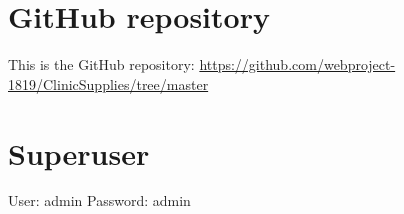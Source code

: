 \documentclass{article}
\begin{document}
\section{GitHub repository}
This is the GitHub repository: \href{https://github.com/webproject-1819/ClinicSupplies/tree/master}{https://github.com/webproject-1819/ClinicSupplies/tree/master}

\section{Superuser}
User: admin
Password: admin
\end{document}
